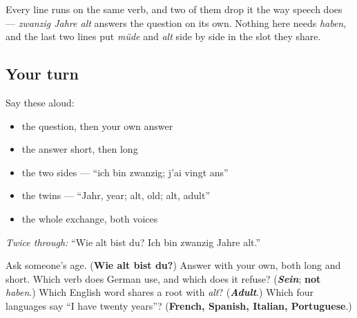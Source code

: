 Every line runs on the same verb, and two of them drop it the way speech does — \emph{zwanzig Jahre alt} answers the question on its own. Nothing here needs \emph{haben}, and the last two lines put \emph{müde} and \emph{alt} side by side in the slot they share.

\subsection*{Your turn}
Say these aloud:

\begin{itemize}
\raggedright
  \item the question, then your own answer
  \item the answer short, then long
  \item the two sides — \textquotedblleft{}ich bin zwanzig; j'ai vingt ans\textquotedblright{}
  \item the twins — \textquotedblleft{}Jahr, year; alt, old; alt, adult\textquotedblright{}
  \item the whole exchange, both voices
\end{itemize}

\emph{Twice through:} \textquotedblleft{}Wie alt bist du? Ich bin zwanzig Jahre alt.\textquotedblright{}

\begin{tcolorbox}[breakable,colback=teal!4,colframe=teal!35!black,title={Before you move on}]
Ask someone's age. (\textbf{Wie alt bist du?}) Answer with your own, both long and short. Which verb does German use, and which does it refuse? (\emph{\textbf{Sein}}; \textbf{not} \emph{haben}.) Which English word shares a root with \emph{alt}? (\emph{\textbf{Adult}}.) Which four languages say \textquotedblleft{}I have twenty years\textquotedblright{}? (\textbf{French, Spanish, Italian, Portuguese}.)
\end{tcolorbox}
